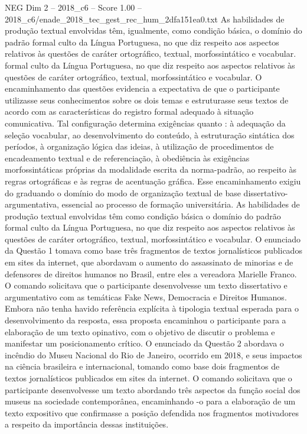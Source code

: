 \begin{textsample}{NEG Dim 2 – 2018\_c6 – Score 1.00 – 2018\_c6/enade\_2018\_tec\_gest\_rec\_hum\_2dfa151ea0.txt}
As habilidades de produção textual envolvidas têm, igualmente, como condição básica, o domínio do padrão formal culto da Língua Portuguesa, no que diz respeito aos aspectos relativos às questões de caráter ortográfico, textual, morfossintático e vocabular. formal culto da Língua Portuguesa, no que diz respeito aos aspectos relativos às questões de caráter ortográfico, textual, morfossintático e vocabular.
O encaminhamento das questões evidencia a expectativa de que o participante utilizasse seus conhecimentos sobre os dois temas e estruturasse seus textos de acordo com as características do registro formal adequado à situação comunicativa.
Tal configuração determina exigências quanto : à adequação da seleção vocabular, ao desenvolvimento do conteúdo, à estruturação sintática dos períodos, à organização lógica das ideias, à utilização de procedimentos de encadeamento textual e de referenciação, à obediência às exigências morfossintáticas próprias da modalidade escrita da norma-padrão, ao respeito às regras ortográficas e às regras de acentuação gráfica.
Esse encaminhamento exigiu do graduando o domínio do modo de organização textual de base dissertativo-argumentativa, essencial ao processo de formação universitária.
As habilidades de produção textual envolvidas têm como condição básica o domínio do padrão formal culto da Língua Portuguesa, no que diz respeito aos aspectos relativos às questões de caráter ortográfico, textual, morfossintático e vocabular.
O enunciado da Questão 1 tomava como base três fragmentos de textos jornalísticos publicados em sites da internet, que abordavam o aumento do assassinato de minorias e de defensores de direitos humanos no Brasil, entre eles a vereadora Marielle Franco.
O comando solicitava que o participante desenvolvesse um texto dissertativo e argumentativo com as temáticas Fake News, Democracia e Direitos Humanos.
Embora não tenha havido referência explícita à tipologia textual esperada para o desenvolvimento da resposta, essa proposta encaminhou o participante para a elaboração de um texto opinativo, com o objetivo de discutir o problema e manifestar um posicionamento crítico.
O enunciado da Questão 2 abordava o incêndio do Museu Nacional do Rio de Janeiro, ocorrido em 2018, e seus impactos na ciência brasileira e internacional, tomando como base dois fragmentos de textos jornalísticos publicados em sites da internet.
O comando solicitava que o participante desenvolvesse um texto abordando três aspectos da função social dos museus na sociedade contemporânea, encaminhando -o para a elaboração de um texto expositivo que confirmasse a posição defendida nos fragmentos motivadores a respeito da importância dessas instituições.

\end{textsample}
